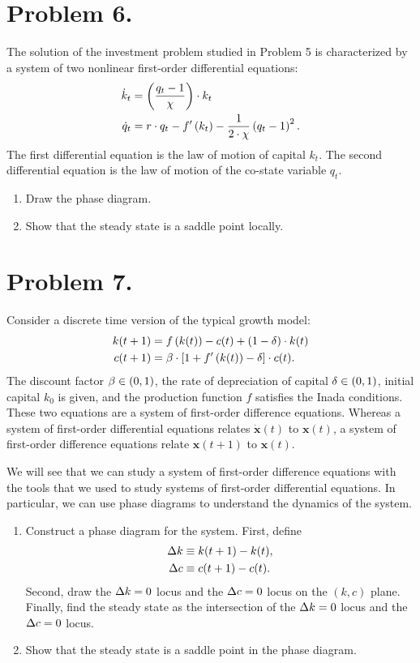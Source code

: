 \documentclass[letterpaper,12pt,leqno]{article}
\begin{document}
\section*{Problem 6.}

The solution of the investment problem studied in Problem 5 is characterized by a system of two nonlinear first-order differential equations:
\begin{align*}
\dot{k}_{t} &=\left( \frac{q_{t}-1}{\chi} \right)\cdot  k_{t} \\
\dot{q}_{t} &=r\cdot q_{t}-f'\left( k_{t} \right) -\frac{1}{2\cdot \chi}\left( q_{t}-1 \right)^{2}.
\end{align*}
The first differential equation is the law of motion of capital $k_{t}$. The second differential equation is the law of motion of the co-state variable $q_{t}$.

\begin{enumerate}
\item Draw the phase diagram.
\item Show that the steady state is a saddle point locally.
\end{enumerate}

\section*{Problem 7.}

Consider a discrete time version of the typical growth model:
\begin{align*}
k(t+1) &=f\left( k(t) \right) -c(t) +\left( 1-\delta \right)\cdot  k(t) \\
c(t+1) &=\beta\cdot  \left[  1+f'\left( k(t) \right) -\delta  \right]\cdot  c(t) .
\end{align*} 
The discount factor $\beta \in \left( 0,1 \right)$, the rate of depreciation of capital $\delta \in \left( 0,1 \right)$, initial capital $k_{0}$ is given, and the production function $f$ satisfies the Inada conditions. These two equations are a system of first-order difference equations. Whereas a system of first-order differential equations relates $\bm{\dot{x}}(t) $ to $\bm{x}(t)$, a system of first-order difference equations relate $\bm{x}(t+1) $ to $\bm{x}(t)$.

We will see that we can study a system of first-order difference equations with the tools that we used to study systems of first-order differential equations. In particular, we can use phase diagrams to understand the dynamics of the system.

\begin{enumerate}
\item Construct a phase diagram for the system. First, define 
\begin{align*}
\Delta k & \equiv k(t+1) -k(t) , \\
\Delta c & \equiv c(t+1) -c(t) .
\end{align*}
Second, draw the $\Delta k=0$ locus and the $\Delta c=0$ locus on the $(k,c)$ plane. Finally, find the steady state as the intersection of the $\Delta k=0$ locus and the $ \Delta c=0$ locus.
\item Show that the steady state is a saddle point in the phase diagram.
\end{enumerate}
\end{document}

